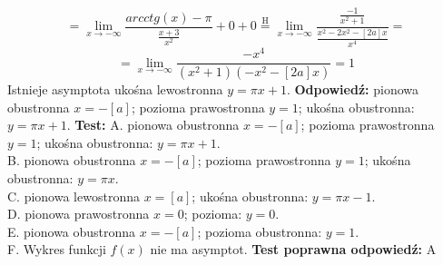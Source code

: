 \documentclass[12pt, a4paper]{article}
\theoremstyle{definition} %
\newcommand{\rozwStop}{\newline}                                            %
\newcommand{\odpStart}{\noindent \textbf{Odpowiedź:}\newline}    %
\newcommand{\odpStop}{\newline}                                             %
\newcommand{\testStart}{\noindent \textbf{Test:}\newline} %
\newcommand{\testStop}{\newline} %
\newcommand{\kluczStart}{\noindent \textbf{Test poprawna odpowiedź:}\newline} %
\newcommand{\kluczStop}{\newline} %
\begin{document}
$$=\lim_{x\to-\infty}\frac{arcctg(x)-\pi}{\frac{x+3}{x^{2}}}+0+0\stackrel{\text{H}}{=}\lim_{x\to-\infty}\frac{\frac{-1}{x^{2}+1}}{\frac{x^{2}-2x^{2}-[2a]x}{x^{4}}}=$$
$$=\lim_{x\to-\infty}\frac{-x^{4}}{(x^{2}+1)(-x^{2}-[2a]x)}=1$$
Istnieje asymptota ukośna lewostronna $y=\pi x+1$.
\rozwStop
\odpStart
pionowa obustronna $x=-[a]$; pozioma prawostronna $y=1$; ukośna obustronna: $y=\pi x+1$.
\odpStop
\testStart
A. pionowa obustronna $x=-[a]$; pozioma prawostronna $y=1$; ukośna obustronna: $y=\pi x+1$.\\
B. pionowa obustronna $x=-[a]$; pozioma prawostronna $y=1$; ukośna obustronna: $y=\pi x$.\\
C. pionowa lewostronna $x=[a]$; ukośna obustronna: $y=\pi x-1$.\\
D. pionowa prawostronna $x=0$; pozioma: $y=0$.\\
E. pionowa obustronna $x=-[a]$; pozioma obustronna: $y=1$.\\
F. Wykres funkcji $f(x)$ nie ma asymptot.
\testStop
\kluczStart
A
\kluczStop
\end{document}

